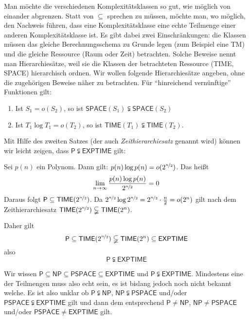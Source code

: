 Man möchte die verschiedenen Komplexitätsklassen so gut, wie möglich von einander abgrenzen. Statt von $\subseteq$ sprechen zu müssen, möchte man, wo möglich, den Nachweis führen, dass eine Komplexitätsklasse eine echte Teilmenge einer anderen Komplexitätsklasse ist. Es gibt dabei zwei Einschränkungen: die Klassen müssen das gleiche Berechnungsschema zu Grunde legen (zum Beispiel eine TM) und die gleiche Ressource (Raum oder Zeit) betrachten. Solche Beweise nennt man Hierarchiesätze, weil sie die Klassen der betrachteten Ressource (\textsf{TIME}, \textsf{SPACE}) hierarchisch ordnen. Wir wollen folgende Hierarchiesätze angeben, ohne die zugehörigen Beweise näher zu betrachten. Für "`hinreichend vernünftige"' Funktionen gilt:
\begin{enumerate}
  \item Ist $S_1 = o(S_2)$, so ist $\mathsf{SPACE}(S_1) \subsetneqq \mathsf{SPACE}(S_2)$
  \item Ist $T_1 \log T_1 = o(T_2)$, so ist $\mathsf{TIME}(T_1) \subsetneqq \mathsf{TIME}(T_2)$.
\end{enumerate}

Mit Hilfe des zweiten Satzes (der auch \textit{Zeithierarchiesatz} genannt wird) können wir leicht zeigen, dass $\mathsf{P} \subsetneqq \textsf{EXPTIME}$ gilt:

\begin{Bew}
  \hspace{\parindent}Sei $p(n)$ ein Polynom. Dann gilt: $p(n) \log p(n) = o(2^{\nicefrac{n}{2}})$. Das heißt 
  \[ \lim_{n \to \infty} \frac{p(n) \log p(n)}{2^{\nicefrac{n}{2}}} = 0 \]
  Daraus folgt $\mathsf{P} \subseteq \mathsf{TIME}(2^{\nicefrac{n}{2}})$. Da $2^{\nicefrac{n}{2}} \log 2^{\nicefrac{n}{2}} = 2^{\nicefrac{n}{2}} \cdot \frac{n}{2} = o(2^n)$ gilt nach dem Zeithierarchiesatz $\mathsf{TIME}(2^{\nicefrac{n}{2}}) \subsetneqq \mathsf{TIME}(2^n)$.
  
  Daher gilt
  \[ \mathsf{P} \subseteq \mathsf{TIME}(2^{\nicefrac{n}{2}}) \subsetneqq \mathsf{TIME}(2^n) \subseteq \mathsf{EXPTIME} \]
  also
  \[ \mathsf{P} \subsetneqq \mathsf{EXPTIME} \]
\end{Bew}

Wir wissen $\mathsf{P} \subseteq \mathsf{NP} \subseteq \mathsf{PSPACE} \subseteq \mathsf{EXPTIME}$ und $\mathsf{P} \subsetneqq \mathsf{EXPTIME}$. Mindestens eine der Teilmengen muss also echt sein, es ist bislang jedoch noch nicht bekannt welche. Es ist also unklar ob $\mathsf{P} \subsetneqq \mathsf{NP}$, $\mathsf{NP} \subsetneqq \mathsf{PSPACE}$ und/oder $\mathsf{PSPACE} \subsetneqq  \mathsf{EXPTIME}$ gilt und dann dem entsprechend $\mathsf{P} \neq \mathsf{NP}$, $\mathsf{NP} \neq  \mathsf{PSPACE}$ und/oder $\mathsf{PSPACE} \neq  \mathsf{EXPTIME}$ gilt.

